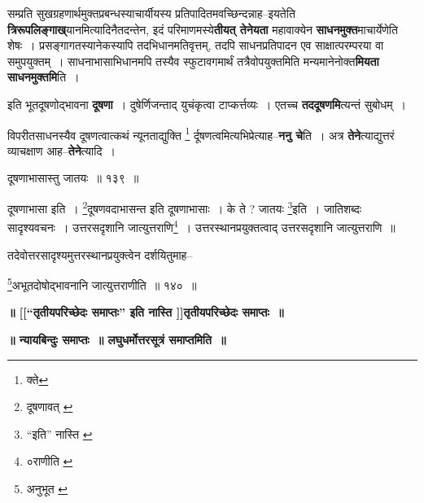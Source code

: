 \documentclass[article,12pt,a4paper]{memoir}
\begin{document}
	  \pstart सम्प्रति सुखग्रहणार्थमुक्तप्रबन्धस्याचार्यीयस्य प्रतिपादितमवच्छिन्दन्नाह--इयतेति \textbf{त्रिरूपलिङ्गाख्}यानमित्यादिनैतदन्तेन, इदं परिमाणमस्ये\textbf{तीयत् तेनेयता} महावाक्येन \textbf{साधनमुक्त}माचार्येणेति शेषः । प्रसङ्गागतस्यानेकस्यापि तदभिधानमतिवृत्तम्, तदपि साधनप्रतिपादन एव साक्षात्परम्परया वा समुपयुक्तम् । साधनाभासाभिधानमपि तस्यैव स्फुटावगमार्थं तत्रैवोपयुक्तमिति मन्यमानेनोक्त\textbf{मियता साधनमुक्तमि}ति ।
	\pend
      

	  \pstart इति भूतदूषणोद्भावना \textbf{दूषणा} । दुषेर्णिजन्ताद् युचंकृत्वा टाप्कर्त्तव्यः । एतच्च \textbf{तददूषणमि}त्यन्तं सुबोधम् ।
	\pend
      

	  \pstart विपरीतसाधनस्यैव दूषणत्वात्कथं न्यूनताद्युक्ति \footnote{क्ते} र्दूषणत्वमित्यभिप्रेत्याह--\textbf{ननु चे}ति । अत्र \textbf{तेने}त्याद्युत्तरं व्याचक्षाण आह--\textbf{तेने}त्यादि ।
	\pend
      \leavevmode{}
	  \bigskip
	  \begingroup
	
	  \bigskip
	  \begingroup
	

	  \pstart दूषणाभासास्तु जातयः ॥ १३९ ॥
	\pend
      
	  \endgroup
	 

	  \pstart दूषणाभासा इति । \footnote{दूषणावत् \cite{dp-msB}}दूषणवदाभासन्त इति दूषणाभासाः । के ते ? जातयः \footnote{“इति” नास्ति \cite{dp-msA} \cite{dp-msB} \cite{dp-edP} \cite{dp-edH} \cite{dp-edE} \cite{dp-edN}}इति । जातिशब्दः सादृश्यवचनः । उत्तरसदृशानि जात्युत्तराणि\footnote{०राणीति \cite{dp-msA} \cite{dp-edP} \cite{dp-edH} \cite{dp-edE}} । उत्तरस्थानप्रयुक्तत्वाद् उत्तरसदृशानि जात्युत्तराणि ॥
	\pend
       

	  \pstart तदेवोत्तरसादृश्यमुत्तरस्थानप्रयुक्त्वेन दर्शयितुमाह--
	\pend
       
	  \bigskip
	  \begingroup
	

	  \pstart \footnote{अनुभूत \cite{dp-msB} \cite{dp-edP} \cite{dp-edH}}अभूतदोषोद्भावनानि जात्युत्तराणीति ॥ १४० ॥
	\pend
      
	  \endgroup
	 

	  \begin{center}%
	\textbf{॥ [[“तृतीयपरिच्छेदः समाप्तः” इति नास्ति \cite{dp-msC} \cite{dp-msD}]]तृतीयपरिच्छेदः समाप्तः ॥}
	\end{center}
	 

	  \begin{center}%
	\textbf{॥ न्यायबिन्दुः समाप्तः ॥ लघुधर्मोत्तरसूत्रं समाप्तमिति ॥}
	\end{center}
	
	  \endgroup
	
\end{document}
